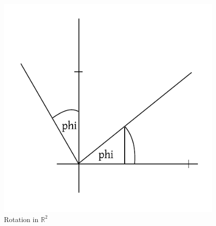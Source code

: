 \documentclass[a4paper,landscape,twocolumn]{article}
\theoremstyle{definition}
\begin{document}
\begin{figure}[!h]
  \begin{center}
    \includegraphics{img/rotation_in_R2.pdf}
    \caption{Rotation in $\mathbb R^2$}
  \end{center}
\end{figure}
\end{document}

